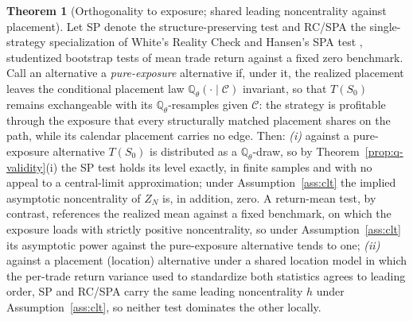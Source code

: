 \documentclass[preprint,12pt]{elsarticle}
\theoremstyle{definition}
\newtheorem{theorem}{Theorem}
\begin{document}
\begin{theorem}[Orthogonality to exposure; shared leading noncentrality
against placement]
\label{prop:orthogonality}
Let SP denote the structure-preserving test and RC/SPA the single-strategy
specialization of White's Reality Check \cite{white2000} and Hansen's SPA test
\cite{hansen2005}, studentized bootstrap tests of mean trade return against a
fixed zero benchmark. Call an alternative a \emph{pure-exposure} alternative if,
under it, the realized placement leaves the conditional placement law
$\mathbb{Q}_\theta(\cdot\mid\mathcal C)$ invariant, so that $T(S_0)$ remains
exchangeable with its $\mathbb{Q}_\theta$-resamples given $\mathcal C$: the
strategy is profitable through the exposure that every structurally matched
placement shares on the path, while its calendar placement carries no edge. Then:
\emph{(i)} against a pure-exposure alternative $T(S_0)$ is distributed as a
$\mathbb{Q}_\theta$-draw, so by Theorem~\ref{prop:q-validity}(i) the SP test holds
its level exactly, in finite samples and with no appeal to a central-limit
approximation; under Assumption~\ref{ass:clt} the implied asymptotic noncentrality
of $Z_N$ is, in addition, zero. A return-mean test, by contrast, references the
realized mean against a fixed benchmark, on which the exposure loads with strictly
positive noncentrality, so under Assumption~\ref{ass:clt} its asymptotic power
against the pure-exposure alternative tends to one;
\emph{(ii)} against a placement (location) alternative under a shared location
model in which the per-trade return variance used to standardize both statistics
agrees to leading order, SP and RC/SPA carry the same leading noncentrality $h$
under Assumption~\ref{ass:clt}, so neither test dominates the other locally.
\end{theorem}
\end{document}
